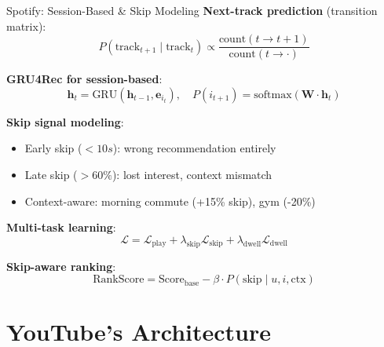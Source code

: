 \documentclass[aspectratio=169, 11pt]{beamer}
\begin{document}
\begin{frame}{Spotify: Session-Based \& Skip Modeling}
\small
\textbf{Next-track prediction} (transition matrix):
\begin{equation*}
P(\text{track}_{t+1} \mid \text{track}_t) \propto \frac{\text{count}(t \to t+1)}{\text{count}(t \to \cdot)}
\end{equation*}

\vspace{0.1cm}
\textbf{GRU4Rec for session-based}:
\begin{equation*}
\mathbf{h}_t = \text{GRU}(\mathbf{h}_{t-1}, \mathbf{e}_{i_t}), \quad P(i_{t+1}) = \text{softmax}(\mathbf{W} \cdot \mathbf{h}_t)
\end{equation*}

\vspace{0.1cm}
\textbf{Skip signal modeling}:
\begin{itemize}
    \item Early skip ($<10s$): wrong recommendation entirely
    \item Late skip ($>60\%$): lost interest, context mismatch
    \item Context-aware: morning commute (+15\% skip), gym (-20\%)
\end{itemize}

\vspace{0.1cm}
\textbf{Multi-task learning}:
\begin{equation*}
\mathcal{L} = \mathcal{L}_{\text{play}} + \lambda_{\text{skip}} \mathcal{L}_{\text{skip}} + \lambda_{\text{dwell}} \mathcal{L}_{\text{dwell}}
\end{equation*}

\textbf{Skip-aware ranking}:
\begin{equation*}
\text{RankScore} = \text{Score}_{\text{base}} - \beta \cdot P(\text{skip} \mid u,i,\text{ctx})
\end{equation*}
\end{frame}

\section{YouTube's Architecture}
\end{document}
